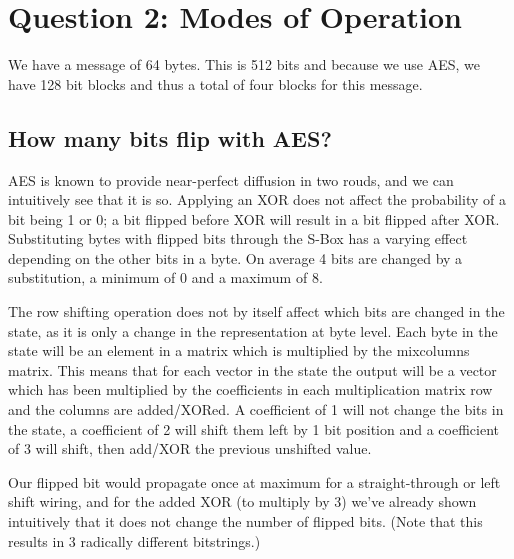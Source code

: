 \documentclass{article}
\begin{document}



\section{Question 2: Modes of Operation}

We have a message of 64 bytes. This is 512 bits and because we use AES, we have 128 bit blocks and thus a total of four blocks for this message.

\subsection{How many bits flip with AES?}
AES is known to provide near-perfect diffusion in two rouds, and we can intuitively see that it is so.
Applying an XOR does not affect the probability of a bit being 1 or 0; a bit flipped before XOR will result in a bit flipped after XOR.
Substituting bytes with flipped bits through the S-Box has a varying effect depending on the other bits in a byte.
On average 4 bits are changed by a substitution, a minimum of 0 and a maximum of 8.

The row shifting operation does not by itself affect which bits are changed in the state, as it is only a change in the representation at byte level.
Each byte in the state will be an element in a matrix which is multiplied by the mixcolumns matrix.
This means that for each vector in the state the output will be a vector which has been multiplied by the coefficients in each multiplication matrix row and the columns are added/XORed.
A coefficient of 1 will not change the bits in the state, a coefficient of 2 will shift them left by 1 bit position and a coefficient of 3 will shift, then add/XOR the previous unshifted value.

Our flipped bit would propagate once at maximum for a straight-through or left shift wiring, and for the added XOR (to multiply by 3) we've already shown intuitively that it does not change the number of flipped bits.
(Note that this results in 3 radically different bitstrings.)
\end{document}

